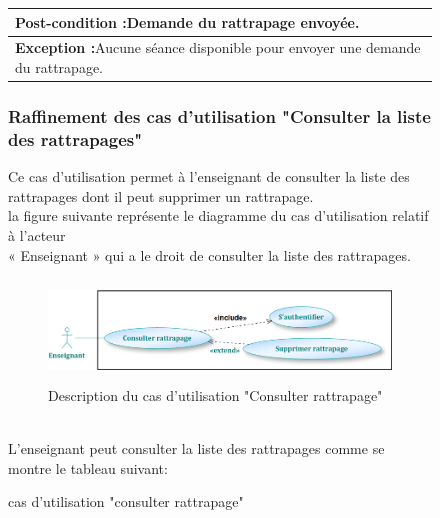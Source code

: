\documentclass[12 pt]{report}
\begin{document}
\begin{figure}[h]
\begin{center}
\begin{table}[htbp]
\begin{center}
\begin{tabular}{|p{17 cm}|}
 \\
 \hline
 \cellcolor{MistyRose}  \textbf{Post-condition :}Demande du rattrapage envoyée.\\
 \hline
  \cellcolor{PowderBlue}  \textbf{Exception :}Aucune séance disponible pour envoyer une  demande du rattrapage.\\
 \hline

\end{tabular}
\end{center}
\end{table}
\subsubsection{Raffinement des cas d’utilisation "Consulter la liste des rattrapages"}
Ce cas d'utilisation permet à l'enseignant de consulter la liste des rattrapages dont il peut 
 supprimer un rattrapage.\\
la figure suivante représente le diagramme du cas d’utilisation  relatif à l’acteur \\« Enseignant » qui a le droit de consulter la liste des rattrapages.
\begin{figure}[h]
\begin{center}
\includegraphics[width= 12cm , height =2.7cm]{enseignant2.png}
\caption{Description du cas d'utilisation "Consulter rattrapage"}
\end{center}
\end{figure}
\\
L'enseignant peut consulter la liste des rattrapages comme se montre le tableau suivant:
\begin{table}[htbp]
\begin{center}
\caption{ cas d'utilisation "consulter rattrapage"}


\end{center}
\end{table}
\end{center}
\end{figure}
\end{document}
